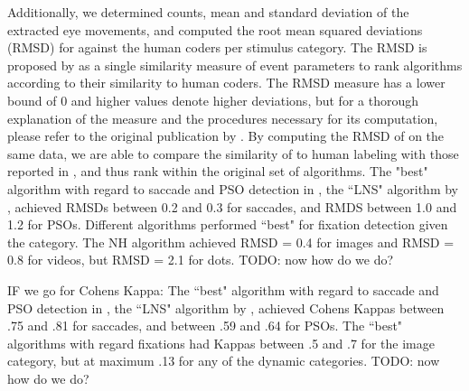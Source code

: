 

Additionally, we determined counts, mean and standard deviation of the
extracted eye movements, and computed the root mean squared deviations (RMSD)
for \remodnav against the human coders per stimulus category. The RMSD is
proposed by \cite{Andersson2017} as a single similarity measure of event
parameters to rank algorithms according to their similarity to human coders.
The RMSD measure has a lower bound of 0 and higher values denote higher
deviations, but for a thorough explanation of the measure and the procedures
necessary for its computation, please refer to the original publication by
\cite{Andersson2017}. By computing the RMSD of \remodnav on the same data, we
are able to compare the similarity of \remodnav to human labeling with those
reported in \cite{Andersson2017}, and thus rank \remodnav within the original
set of algorithms. 
The "best" algorithm with regard to saccade and PSO detection in
\cite{Andersson2017}, the ``LNS" algorithm by \cite{Larsson2013}, achieved
RMSDs between 0.2 and 0.3 for saccades, and RMDS between 1.0 and 1.2 for PSOs.
Different algorithms performed ``best" for fixation detection given the
category. The NH algorithm achieved RMSD = 0.4 for images and RMSD = 0.8 for
videos, but RMSD = 2.1 for dots. TODO: now how do we do?  

IF we go for Cohens Kappa: The ``best" algorithm with regard to saccade and PSO
detection in \cite{Andersson2017}, the ``LNS" algorithm by \cite{Larsson2013},
achieved Cohens Kappas between .75 and .81 for saccades, and between .59 and
.64 for PSOs. The ``best" algorithms with regard fixations had Kappas between
.5 and .7 for the image category, but at maximum .13 for any of the dynamic
categories. TODO: now how do we do?


